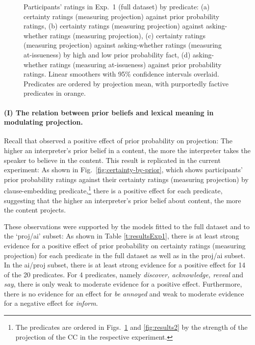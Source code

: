\documentclass[11pt,fleqn]{article}
\newcommand{\6}{\mbox{$[\hspace*{-.6mm}[$}}
\newcommand{\9}{\mbox{$]\hspace*{-.6mm}]$}}
\begin{document}
\begin{figure}[h!]
\caption{Participants' ratings in Exp.~1 (full dataset) by predicate: (a) certainty ratings (measuring projection) against prior probability ratings, (b) certainty ratings (measuring projection) against asking-whether ratings (measuring projection), (c) certainty ratings (measuring projection) against asking-whether ratings (measuring at-issueness) by high and low prior probability fact, (d) asking-whether ratings (measuring at-issueness) against prior probability ratings. Linear smoothers with 95\% confidence intervals overlaid. Predicates are ordered by projection mean, with purportedly factive predicates in orange.}\label{fig:results1}
\end{figure}

\paragraph{(I) The relation between prior beliefs and lexical meaning in modulating projection.} Recall that \citealt{degen-tonhauser-openmind} observed a positive effect of prior probability on projection: The higher an interpreter's prior belief in a content, the more the interpreter takes the speaker to believe in the content. This result is replicated in the current experiment: As shown in Fig.~\ref{fig:certainty-by-prior}, which shows participants' prior probability ratings against their certainty ratings (measuring projection) by clause-embedding predicate,\footnote{The predicates are ordered in Figs.~\ref{fig:results1} and \ref{fig:results2} by the strength of the projection of the CC in the respective experiment.} there is a positive effect for each predicate, suggesting that the higher an interpreter's prior belief about content, the more the content projects.

These observations were supported by the models fitted to the full dataset and to the `proj/ai' subset: As shown in Table \ref{t:resultsExp1}, there is at least strong evidence for a positive effect of prior probability on certainty ratings (measuring projection) for each predicate in the full dataset as well as in the proj/ai subset. In the ai/proj subset, there is at least strong evidence for a positive effect for 14 of the 20 predicates. For 4 predicates, namely {\em discover, acknowledge, reveal} and {\em say}, there is only weak to moderate evidence for a positive effect. Furthermore, there is no evidence for an effect for {\em be annoyed} and weak to moderate evidence for a negative effect for {\em inform}. 
\end{document}
